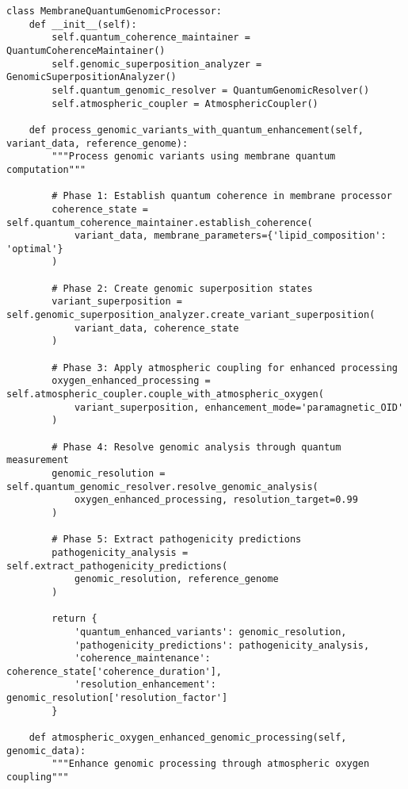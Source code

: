 \documentclass[12pt,a4paper]{article}
\begin{document}
\begin{lstlisting}[style=pythonstyle, caption=Membrane Quantum Genomic Processor]
class MembraneQuantumGenomicProcessor:
    def __init__(self):
        self.quantum_coherence_maintainer = QuantumCoherenceMaintainer()
        self.genomic_superposition_analyzer = GenomicSuperpositionAnalyzer()
        self.quantum_genomic_resolver = QuantumGenomicResolver()
        self.atmospheric_coupler = AtmosphericCoupler()
        
    def process_genomic_variants_with_quantum_enhancement(self, variant_data, reference_genome):
        """Process genomic variants using membrane quantum computation"""
        
        # Phase 1: Establish quantum coherence in membrane processor
        coherence_state = self.quantum_coherence_maintainer.establish_coherence(
            variant_data, membrane_parameters={'lipid_composition': 'optimal'}
        )
        
        # Phase 2: Create genomic superposition states
        variant_superposition = self.genomic_superposition_analyzer.create_variant_superposition(
            variant_data, coherence_state
        )
        
        # Phase 3: Apply atmospheric coupling for enhanced processing
        oxygen_enhanced_processing = self.atmospheric_coupler.couple_with_atmospheric_oxygen(
            variant_superposition, enhancement_mode='paramagnetic_OID'
        )
        
        # Phase 4: Resolve genomic analysis through quantum measurement
        genomic_resolution = self.quantum_genomic_resolver.resolve_genomic_analysis(
            oxygen_enhanced_processing, resolution_target=0.99
        )
        
        # Phase 5: Extract pathogenicity predictions
        pathogenicity_analysis = self.extract_pathogenicity_predictions(
            genomic_resolution, reference_genome
        )
        
        return {
            'quantum_enhanced_variants': genomic_resolution,
            'pathogenicity_predictions': pathogenicity_analysis,
            'coherence_maintenance': coherence_state['coherence_duration'],
            'resolution_enhancement': genomic_resolution['resolution_factor']
        }
    
    def atmospheric_oxygen_enhanced_genomic_processing(self, genomic_data):
        """Enhance genomic processing through atmospheric oxygen coupling"""
        

\end{lstlisting}
\end{document}
